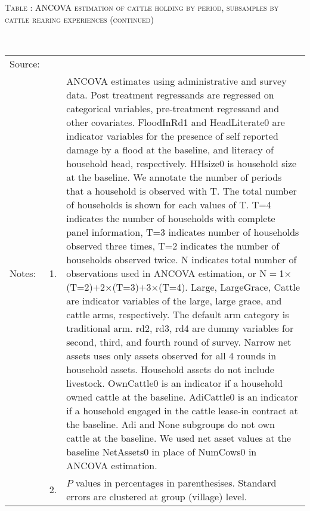 \addtocounter{table}{-1}
\hspace{-1cm}\begin{minipage}[t]{14cm}
\hfil\textsc{\normalsize Table \thetable: ANCOVA estimation of cattle holding by period, subsamples by cattle rearing experiences (continued) \label{tab ANCOVA NumCows Subsample by Experience timevarying2}}\\
\setlength{\tabcolsep}{1pt}
\setlength{\baselineskip}{8pt}
\renewcommand{\arraystretch}{.52}
\hfil{}\\
\renewcommand{\arraystretch}{.8}
\setlength{\tabcolsep}{1pt}
\begin{tabular}{>{\hfill\scriptsize}p{1cm}<{}>{\hfill\scriptsize}p{.25cm}<{}>{\scriptsize}p{12cm}<{\hfill}}
Source:& \multicolumn{2}{l}{\scriptsize Estimated with GUK administrative and survey data.}\\
Notes: & 1. & ANCOVA estimates using administrative and survey data. Post treatment regressands are regressed on categorical variables, pre-treatment regressand and other covariates. \textsf{FloodInRd1} and \textsf{HeadLiterate0} are indicator variables for the presence of self reported damage by a flood at the baseline, and literacy of household head, respectively. \textsf{HHsize0} is household size at the baseline. We annotate the number of periods that a household is observed with \textsf{T}. The total number of households is shown for each values of \textsf{T}. \textsf{T=4} indicates the number of households with complete panel information, \textsf{T=3} indicates number of households observed three times, \textsf{T=2} indicates the number of households observed twice. \textsf{N} indicates total number of observations used in ANCOVA estimation, or \textsf{N$=$1$\times$(T=2)+2$\times$(T=3)+3$\times$(T=4)}.  \textsf{Large}, \textsf{LargeGrace}, \textsf{Cattle} are indicator variables of the \textsf{large}, \textsf{large grace}, and \textsf{cattle} arms, respectively. The default arm category is \textsf{traditional} arm. \textsf{rd2, rd3, rd4} are dummy variables for second, third, and fourth round of survey. Narrow net assets uses only assets observed for all 4 rounds in household assets. Household assets do not include livestock. \textsf{OwnCattle0} is an indicator if a household owned cattle at the baseline. \textsf{AdiCattle0} is an indicator if a household engaged in the cattle lease-in contract at the baseline.  \textsf{Adi} and \textsf{None} subgroups do not own cattle at the baseline. We used net asset values at the baseline \textsf{NetAssets0} in place of \textsf{NumCows0} in ANCOVA estimation.\\
& 2. & $P$ values in percentages in parenthesises. Standard errors are clustered at group (village) level.
\end{tabular}
\end{minipage}
